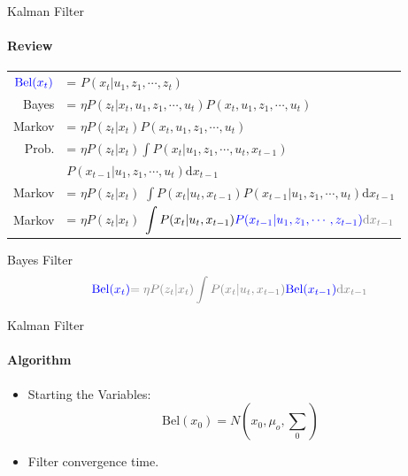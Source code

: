 \documentclass[aspectratio=169]{beamer}
\begin{document}
\begin{frame}{Kalman Filter}
    \framesubtitle{Review}
    \setlength\extrarowheight{5pt}
        \begin{tabular}{r l}
            $\color{blue}{\text{Bel}}(x_t)$ & = $P(x_t| u_1, z_1,  \cdots, z_t)$ \\
            Bayes & = $\eta P(z_t|x_t,  u_1, z_1,  \cdots,  u_t)P(x_t, u_1, z_1, \cdots, u_t)$ \\
            Markov & = $\eta P(z_t|x_t)P(x_t, u_1, z_1, \cdots, u_t)$ \\
            Prob.  & = $\eta P(z_t|x_t)\displaystyle\int P(x_t| u_1, z_1, \cdots, u_t,x_{t-1})$ \\
                        &  \quad \quad \quad $P(x_{t-1}| u_1, z_1, \cdots, u_t)\text{d}x_{t-1}$\\
            Markov & = $\eta P(z_t|x_t)$ $\displaystyle\int P(x_t| u_t,x_{t-1})P(x_{t-1}| u_1, z_1, \cdots, u_t)\text{d}x_{t-1}$ \\
            Markov & = $\eta P(z_t|x_t)$ $\displaystyle\int P(x_t| u_t,x_{t-1})\color{blue}{P(x_{t-1}| u_1, z_1, \cdots, z_{t-1}})\color{gray}{\text{d}x_{t-1}}$ \\
        \end{tabular}   
    \begin{block}{Bayes Filter}
        \begin{equation*}
            \color{blue}{\text{Bel}}(x_t)  \color{gray}{=\eta P(z_t|x_t)\displaystyle\int P(x_t| u_t,x_{t-1})}\textcolor{blue}{\text{Bel}(x_{t-1})}\text{d}x_{t-1}
        \end{equation*}
    \end{block}
\end{frame}

\begin{frame}[c]{Kalman Filter}
    \framesubtitle{Algorithm}
    \begin{itemize}
        \item Starting the Variables:
        \begin{equation}
            \text{Bel}(x_0) = N\left(x_0, \mu_o, {\textstyle\sum} _0\right)
        \end{equation}
        \item Filter convergence time.
    \end{itemize}
\end{frame}
\end{document}
